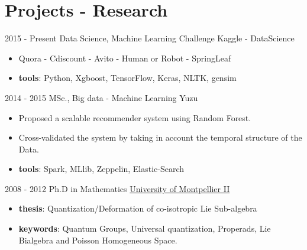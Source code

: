 \documentclass[letterpaper]{twentysecondcv} %
\begin{document}
\section{Projects - Research}{\faClipboard}
\begin{twenty}
	\twentyitem
			{2015 - }
			{Present}
			{Data Science, Machine Learning Challenge}
			{Kaggle - DataScience}
			{}
			{\begin{itemize}
			 \item Quora - Cdiscount - Avito - Human or Robot - SpringLeaf
			 \item \textbf{tools}: Python, Xgboost, TensorFlow, Keras, NLTK, gensim
			\end{itemize}}
	\twentyitem
    	{2014 - 2015}
		{}
        {MSc., Big data - Machine Learning}
        {Yuzu}
        {}
        {\begin{itemize}
        \item Proposed a scalable recommender system using Random Forest.
        \item Cross-validated the system by taking in account the temporal structure of the Data.
        \item \textbf{tools}: Spark, MLlib, Zeppelin, Elastic-Search
		\end{itemize}}
	\twentyitem
			{2008 - 2012}
			{}
			{Ph.D in Mathematics}
			{\href{http://www.umontpellier.fr/}{University of Montpellier II}}
			{}
			{\begin{itemize}
			\item \textbf{thesis}: Quantization/Deformation of co-isotropic Lie Sub-algebra
			\item \textbf{keywords}: Quantum Groups, Universal quantization, Properads, Lie Bialgebra and Poisson Homogeneous Space.
			\end{itemize}}
\end{twenty}
\end{document}
